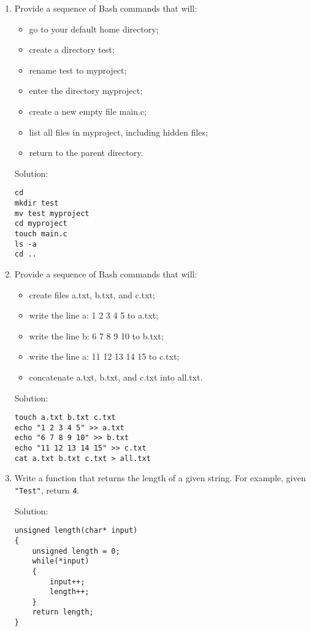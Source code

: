 \documentclass[11pt]{article}
\begin{document}
\begin{enumerate}[leftmargin=*]

\item Provide a sequence of Bash commands that will:
    \begin{itemize}
        \item go to your default home directory;
        \item create a directory test;
        \item rename test to myproject;
        \item enter the directory myproject;
        \item create a new empty file main.c;
        \item list all files in myproject, including hidden files;
        \item return to the parent directory.
    \end{itemize}

Solution:
\begin{verbatim}
cd
mkdir test
mv test myproject
cd myproject
touch main.c
ls -a
cd ..
\end{verbatim}
\item Provide a sequence of Bash commands that will:
    \begin{itemize}
        \item create files a.txt, b.txt, and c.txt;
        \item write the line a: 1 2 3 4 5 to a.txt;
        \item write the line b: 6 7 8 9 10 to b.txt;
        \item write the line a: 11 12 13 14 15 to c.txt;
        \item concatenate a.txt, b.txt, and c.txt into all.txt.
    \end{itemize}

Solution:
\begin{verbatim}
touch a.txt b.txt c.txt
echo "1 2 3 4 5" >> a.txt
echo "6 7 8 9 10" >> b.txt
echo "11 12 13 14 15" >> c.txt
cat a.txt b.txt c.txt > all.txt
\end{verbatim}
\item Write a function that returns the length of a given string. For example, given \verb|"Test"|, return \verb|4|.

Solution:
\begin{verbatim}
unsigned length(char* input)
{
    unsigned length = 0;
    while(*input)
    {
        input++;
        length++;
    }
    return length;
}
\end{verbatim}


\end{enumerate}
\end{document}
